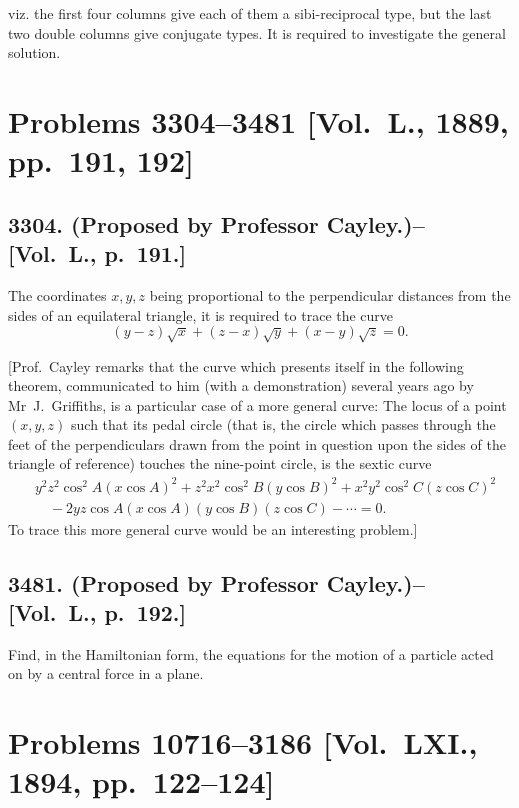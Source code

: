 \documentclass[11pt,a4paper]{article}
\theoremstyle{definition}
\begin{document}
viz. the first four columns give each of them a sibi-reciprocal type, but the last two double columns give conjugate types. It is required to investigate the general solution.

\newpage

\section*{Problems 3304--3481 [Vol.~L., 1889, pp.~191, 192]}

\subsection*{3304. (Proposed by Professor Cayley.)\---[Vol.~L., p.~191.]}

The coordinates $x,y,z$ being proportional to the perpendicular distances from the sides of an equilateral triangle, it is required to trace the curve
\[
(y-z)\sqrt{x} + (z-x)\sqrt{y} + (x-y)\sqrt{z} = 0.
\]

[Prof.~Cayley remarks that the curve which presents itself in the following theorem, communicated to him (with a demonstration) several years ago by Mr~J.~Griffiths, is a particular case of a more general curve: The locus of a point $(x,y,z)$ such that its pedal circle (that is, the circle which passes through the feet of the perpendiculars drawn from the point in question upon the sides of the triangle of reference) touches the nine-point circle, is the sextic curve
\[
\begin{aligned}
&y^2z^2\cos^2A(x\cos A)^2 + z^2x^2\cos^2B(y\cos B)^2 + x^2y^2\cos^2C(z\cos C)^2 \\
&\quad - 2yz\cos A(x\cos A)(y\cos B)(z\cos C) - \cdots = 0.
\end{aligned}
\]
To trace this more general curve would be an interesting problem.]

\subsection*{3481. (Proposed by Professor Cayley.)\---[Vol.~L., p.~192.]}

Find, in the Hamiltonian form, the equations for the motion of a particle acted on by a central force in a plane.

\newpage

\section*{Problems 10716--3186 [Vol.~LXI., 1894, pp.~122--124]}
\end{document}
